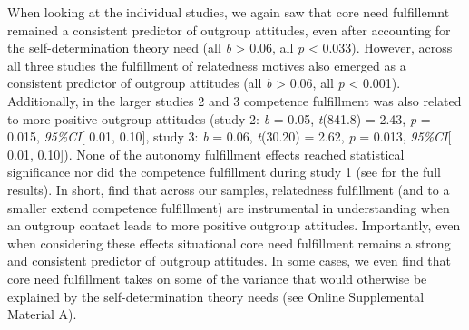When looking at the individual studies, we again saw that core need
fulfillemnt remained a consistent predictor of outgroup attitudes, even
after accounting for the self-determination theory need (all
\textbar{}\textit{b}\textbar{} \textgreater{} 0.06, all \textit{p}
\textless{} 0.033). However, across all three studies the fulfillment of
relatedness motives also emerged as a consistent predictor of outgroup
attitudes (all \textbar{}\textit{b}\textbar{} \textgreater{} 0.06, all
\textit{p} \textless{} 0.001). Additionally, in the larger studies 2 and
3 competence fulfillment was also related to more positive outgroup
attitudes (study 2: \textit{b} = 0.05, \textit{t}(841.8) = 2.43,
\textit{p} = 0.015, \textit{95\%CI}{[} 0.01, 0.10{]}, study 3:
\textit{b} = 0.06, \textit{t}(30.20) = 2.62, \textit{p} = 0.013,
\textit{95\%CI}{[} 0.01, 0.10{]}). None of the autonomy fulfillment
effects reached statistical significance nor did the competence
fulfillment during study 1 (see  for the
full results). In short, find that across our samples, relatedness
fulfillment (and to a smaller extend competence fulfillment) are
instrumental in understanding when an outgroup contact leads to more
positive outgroup attitudes. Importantly, even when considering these
effects situational core need fulfillment remains a strong and
consistent predictor of outgroup attitudes. In some cases, we even find
that core need fulfillment takes on some of the variance that would
otherwise be explained by the self-determination theory needs (see
Online Supplemental Material A).
